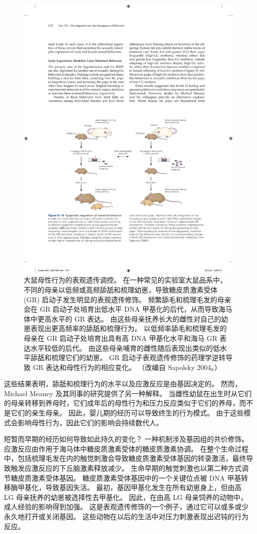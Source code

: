 \begin{figure}[htbp]
	\centering
	\includegraphics[width=0.7\linewidth]{chap51/fig_51_10}
	\caption{大鼠母性行为的表观遗传调控。 在一种常见的实验室大鼠品系中，不同的母亲以低频或高频舔舐和梳理幼崽，导致糖皮质激素受体 (GR) 启动子发生明显的表观遗传修饰。 频繁舔毛和梳理毛发的母亲会在 GR 启动子处培育出低水平 DNA 甲基化的后代，从而导致海马体中更高水平的 GR 表达。 由这些母亲抚养长大的雌性对自己的幼崽表现出更高频率的舔舐和梳理行为。 以低频率舔毛和梳理毛发的母亲在 GR 启动子处培育出具有高 DNA 甲基化水平和海马 GR 表达水平较低的后代。 由这些母亲哺育的雌性随后表现出类似的低水平舔舐和梳理它们的幼崽。 GR 启动子表观遗传修饰的药理学逆转导致 GR 表达和母性行为的相应变化。 （改编自 Sapolsky 2004。）}
	\label{fig:51_10}
\end{figure}

这些结果表明，舔舐和梳理行为的水平以及应激反应是由基因决定的。 然而，Michael Meaney 及其同事的研究提供了另一种解释。 当雌性幼鼠在出生时从它们的母亲转移到养母时，它们成年后的母性行为和压力反应类似于它们的养母，而不是它们的亲生母亲。 因此，婴儿期的经历可以导致终生的行为模式。 由于这些模式会影响母性行为，因此它们的影响会持续数代人。

短暂而早期的经历如何导致如此持久的变化？ 一种机制涉及基因组的共价修饰。 应激反应由作用于海马体中糖皮质激素受体的糖皮质激素协调。 在整个生命过程中，包括梳理毛发在内的触觉刺激会导致糖皮质激素受体基因的转录激活，最终导致触发应激反应的下丘脑激素释放减少。 生命早期的触觉刺激也以第二种方式调节糖皮质激素受体基因。 糖皮质激素受体基因中的一个关键位点被 DNA 甲基转移酶甲基化，导致基因失活。 最初，基因甲基化发生在所有幼崽身上，但由高 LG 母亲抚养的幼崽被选择性去甲基化。 因此，在由高 LG 母亲饲养的动物中，成人经验的影响得到加强。 这是表观遗传修饰的一个例子，通过它可以或多或少永久地打开或关闭基因。 这些动物在以后的生活中对压力刺激表现出迟钝的行为反应。

